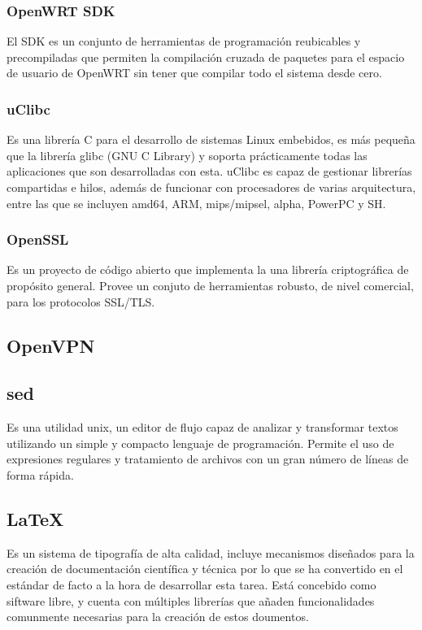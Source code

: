 \documentclass{article}
\begin{document}
        \subsubsection{OpenWRT SDK}
            El SDK es un conjunto de herramientas de programación reubicables y precompiladas que permiten la compilación cruzada de paquetes para el espacio de usuario de OpenWRT sin tener que compilar todo el sistema desde cero.

        \subsubsection{uClibc}
            Es una librería C para el desarrollo de sistemas Linux embebidos, es más pequeña que la librería  glibc (GNU C Library) y soporta prácticamente todas las aplicaciones que son desarrolladas con esta. uClibc  es capaz de gestionar librerías compartidas e hilos, además de funcionar con procesadores de varias arquitectura, entre las que se incluyen amd64, ARM, mips/mipsel, alpha, PowerPC y SH.

        \subsubsection{OpenSSL}
            Es un proyecto de código abierto que implementa la una librería criptográfica de propósito general. Provee un conjuto de herramientas robusto, de nivel comercial, para los protocolos SSL/TLS.

    \subsection{OpenVPN}

    \subsection{sed}
        Es una utilidad unix, un editor de flujo capaz de analizar y transformar textos utilizando un simple y compacto lenguaje de programación. Permite el uso de expresiones regulares y tratamiento de archivos con un gran número de líneas de forma rápida.

    \subsection{\LaTeX}
        Es un sistema de tipografía de alta calidad, incluye mecanismos diseñados para la creación de documentación científica y técnica por lo que se ha convertido en el estándar de facto a la hora de desarrollar esta tarea. Está concebido como siftware libre, y cuenta con múltiples librerías que añaden funcionalidades comunmente necesarias para la creación de estos doumentos.
\end{document}
